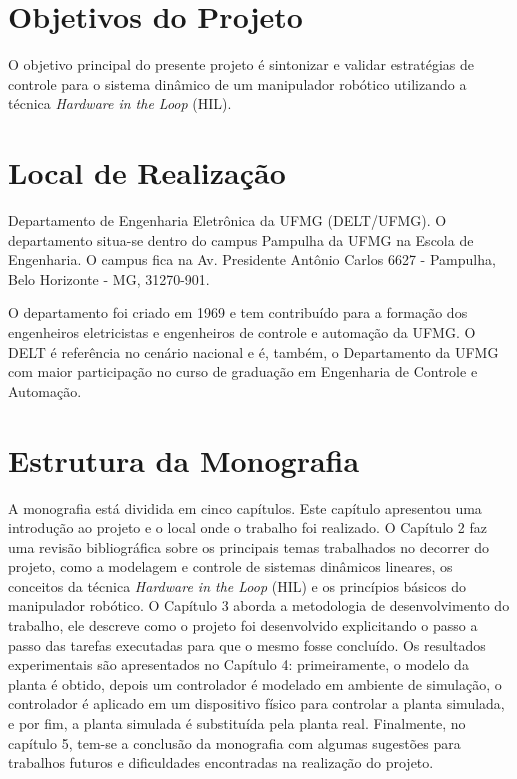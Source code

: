 \section{Objetivos do Projeto}

O objetivo principal do presente projeto é sintonizar e validar estratégias de 
controle para o sistema dinâmico de um manipulador robótico utilizando a técnica 
\emph{Hardware in the Loop} (HIL).

\section{Local de Realização}

Departamento de Engenharia Eletrônica da UFMG (DELT/UFMG). O departamento 
situa-se dentro do campus Pampulha da UFMG na Escola de Engenharia. O campus 
fica na Av. Presidente Antônio Carlos 6627 - Pampulha, Belo Horizonte - MG, 
31270-901.

O departamento foi criado em 1969 e tem contribuído para a formação dos 
engenheiros eletricistas e engenheiros de controle e automação da UFMG. O DELT é 
referência no cenário nacional e é, também, o Departamento da UFMG com maior 
participação no curso de graduação em Engenharia de Controle e Automação.

\section{Estrutura da Monografia}

A monografia está dividida em cinco capítulos. Este capítulo apresentou uma introdução 
ao projeto e o local onde o trabalho foi realizado. O Capítulo 2 faz uma revisão 
bibliográfica sobre os principais temas trabalhados no decorrer do projeto, como a modelagem e
controle de sistemas dinâmicos lineares, os conceitos da técnica \emph{Hardware in the Loop} (HIL)
e os princípios básicos do manipulador robótico. O Capítulo 3 aborda a metodologia de desenvolvimento
do trabalho, ele descreve como o projeto foi desenvolvido explicitando o passo a passo
das tarefas executadas para que o mesmo fosse concluído. Os resultados experimentais são 
apresentados no Capítulo 4: primeiramente, o modelo da planta é obtido, depois um controlador é modelado
em ambiente de simulação, o controlador é aplicado em um dispositivo físico para controlar a planta 
simulada, e por fim, a planta simulada é substituída pela planta real.
Finalmente, no capítulo 5, tem-se a conclusão da monografia com algumas sugestões 
para trabalhos futuros e dificuldades encontradas na realização do projeto.


\clearpage